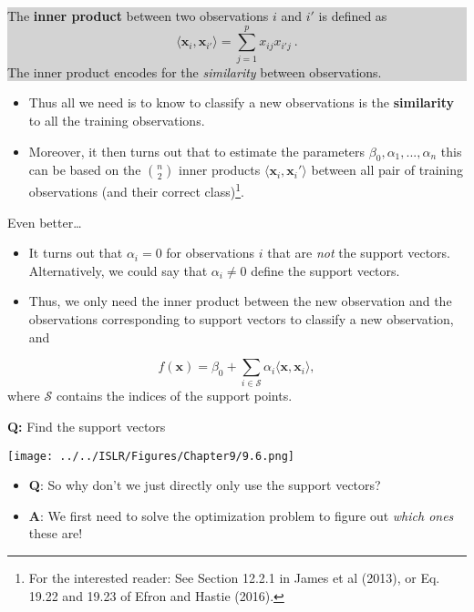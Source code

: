 \documentclass[10pt,ignorenonframetext,]{beamer}
\providecommand{\tightlist}{%
  \setlength{\itemsep}{0pt}\setlength{\parskip}{0pt}}
\begin{document}
\begin{frame}

\begin{center}
\colorbox{lightgray}{\begin{minipage}{10cm}
The {\bf inner product} between two observations $i$ and $i'$ is defined as
$$
\langle {\boldsymbol x}_i , {\boldsymbol x}_{i'}\rangle =\sum_{j=1}^p x_{ij} x_{i' j} \ .
$$
The inner product encodes for the \emph{similarity} between observations.
\end{minipage}}
\end{center}

\begin{itemize}
\item
  Thus all we need is to know to classify a new observations is the
  \textbf{similarity} to all the training observations.
\item
  Moreover, it then turns out that to estimate the parameters
  \(\beta_0,\alpha_1,...,\alpha_n\) this can be based on the
  \({n \choose 2}\) inner products
  \(\langle {\boldsymbol x}_i,{\boldsymbol x}_i' \rangle\) between all
  pair of training observations (and their correct
  class)\footnote{For the interested reader: See Section 12.2.1 in James et al (2013), or Eq. 19.22 and 19.23 of Efron and Hastie (2016).}.
\end{itemize}

\end{frame}

\begin{frame}

Even better\ldots{}

\begin{itemize}
\item
  It turns out that \(\alpha_i=0\) for observations \(i\) that are
  \emph{not} the support vectors. Alternatively, we could say that
  \(\alpha_i \neq 0\) define the support vectors.
\item
  Thus, we only need the inner product between the new observation and
  the observations corresponding to support vectors to classify a new
  observation, and
\end{itemize}

\[
f({\boldsymbol x})=\beta_0 + \sum_{i \in \mathcal{S}} \alpha_i \langle {\boldsymbol x}, {\boldsymbol x}_i\rangle,
\] where \(\mathcal{S}\) contains the indices of the support points.

\end{frame}

\begin{frame}

\textbf{Q:} Find the support vectors

\texttt{[image: ../../ISLR/Figures/Chapter9/9.6.png]}

\begin{itemize}
\tightlist
\item
  \textbf{Q}: So why don't we just directly only use the support
  vectors?
\item
  \textbf{A}: We first need to solve the optimization problem to figure
  out \emph{which ones} these are!
\end{itemize}

\end{frame}
\end{document}
